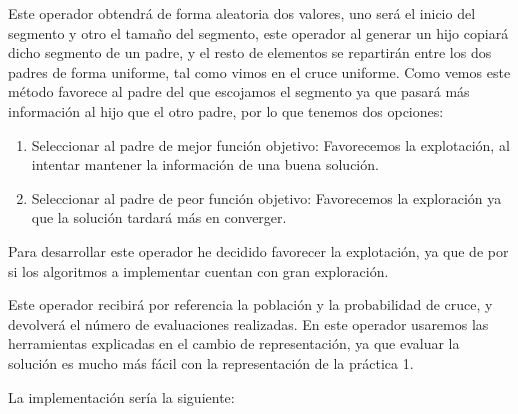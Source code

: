 \documentclass[12pt, spanish]{article}
\begin{document}
Este operador obtendrá de forma aleatoria dos valores, uno será el inicio del segmento y otro el tamaño del segmento, este operador al generar un hijo copiará dicho segmento de un padre, y el resto de elementos se repartirán entre los dos padres de forma uniforme, tal como vimos en el cruce uniforme. Como vemos este método favorece al padre del que escojamos el segmento ya que pasará más información al hijo que el otro padre, por lo que tenemos dos opciones:

\begin{enumerate}
	\item Seleccionar al padre de mejor función objetivo: Favorecemos la explotación, al intentar mantener la información de una buena solución.
	\item Seleccionar al padre de peor función objetivo: Favorecemos la exploración ya que la solución tardará más en converger.
\end{enumerate}

Para desarrollar este operador he decidido favorecer la explotación, ya que de por si los algoritmos a implementar cuentan con gran exploración. 

 
Este operador recibirá por referencia la población y la probabilidad de cruce, y devolverá el número de evaluaciones realizadas. En este operador usaremos las herramientas explicadas en el cambio de representación, ya que evaluar la solución es mucho más fácil con la representación de la práctica 1.

 
La implementación sería la siguiente:
\end{document}
